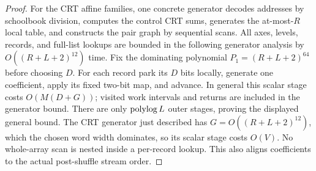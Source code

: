 \begin{proof}
For the CRT affine families, one concrete generator decodes addresses
by schoolbook division, computes the control CRT sums, generates the
at-most-$R$ local table, and constructs the pair graph by sequential
scans. All axes, levels, records, and full-list lookups are bounded in
the following generator analysis by $O((R+L+2)^{12})$ time. Fix the dominating
polynomial $P_1=(R+L+2)^{64}$ before choosing $D$. For each record park
its $D$ bits locally, generate one coefficient, apply its fixed two-bit
map, and advance. In general this scalar stage costs $O(M(D+G))$;
visited work intervals and returns are included in the generator bound.
There are only $\operatorname{polylog} L$ outer stages, proving the displayed
general bound. The CRT generator just described has $G=O((R+L+2)^{12})$,
which the chosen word width dominates, so its scalar stage costs $O(V)$.
No whole-array scan is nested inside a per-record lookup. This also
aligns coefficients to the actual post-shuffle stream order.
\end{proof}

